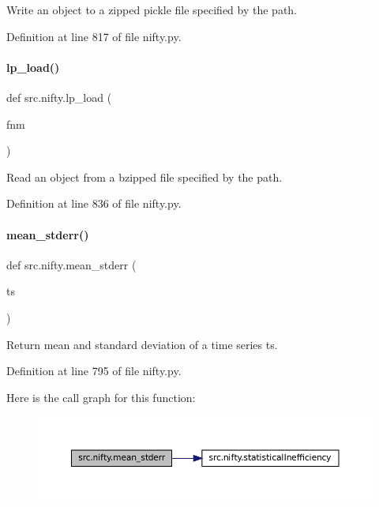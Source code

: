 Write an object to a zipped pickle file specified by the path. 



Definition at line 817 of file nifty.\+py.

\mbox{\label{namespacesrc_1_1nifty_ac39961fd8c4c603c68b53cdd6b577fef}} 
\paragraph{\texorpdfstring{lp\+\_\+load()}{lp\_load()}}
{\footnotesize\ttfamily def src.\+nifty.\+lp\+\_\+load (\begin{DoxyParamCaption}\item[{}]{fnm }\end{DoxyParamCaption})}



Read an object from a bzipped file specified by the path. 



Definition at line 836 of file nifty.\+py.

\mbox{\label{namespacesrc_1_1nifty_a52c467f044a58c56d85fc69b4d6274ad}} 
\paragraph{\texorpdfstring{mean\+\_\+stderr()}{mean\_stderr()}}
{\footnotesize\ttfamily def src.\+nifty.\+mean\+\_\+stderr (\begin{DoxyParamCaption}\item[{}]{ts }\end{DoxyParamCaption})}



Return mean and standard deviation of a time series ts. 



Definition at line 795 of file nifty.\+py.

Here is the call graph for this function\+:
\nopagebreak
\begin{figure}[H]
\begin{center}
\leavevmode
\includegraphics[width=350pt]{namespacesrc_1_1nifty_a52c467f044a58c56d85fc69b4d6274ad_cgraph}
\end{center}
\end{figure}
\mbox{\label{namespacesrc_1_1nifty_a39a23ca3b83aadd4bfdf3eee9abb3257}} 
